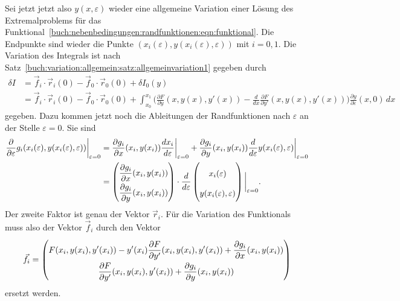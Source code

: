 Sei jetzt jetzt also $y(x,\varepsilon)$ wieder eine allgemeine Variation
einer Lösung des Extremalproblems für das
Funktional~\eqref{buch:nebenbedingungen:randfunktionen:eqn:funktional}.
Die Endpunkte sind wieder die Punkte
$(x_i(\varepsilon),y(x_i(\varepsilon),\varepsilon))$ mit $i=0,1$.
Die Variation des Integrals ist nach
Satz~\ref{buch:variation:allgemein:satz:allgemeinvariation1} 
gegeben durch
\begin{align*}
\delta I
&=
\vec{f}_i\cdot \vec{r}_i(0) - \vec{f}_0\cdot\vec{r}_0(0)
+
\delta I_0(y)
\\
&=
\vec{f}_i\cdot \vec{r}_i(0) - \vec{f}_0\cdot\vec{r}_0(0)
+
\int_{x_0}^{x_1}
\biggl(
\frac{\partial F}{\partial y}(x,y(x),y'(x))
-
\frac{d}{dx}\frac{\partial F}{\partial y'}(x,y(x),y'(x))
\biggr)
\frac{\partial y}{\partial\varepsilon}(x,0)
\,dx
\end{align*}
gegeben.
Dazu kommen jetzt noch die Ableitungen der Randfunktionen nach
$\varepsilon$ an der Stelle $\varepsilon=0$.
Sie sind
\begin{align*}
\frac{\partial}{\partial\varepsilon}
g_i(x_i(\varepsilon),y(x_i(\varepsilon),\varepsilon))
\bigg|_{\varepsilon=0}
&=
\frac{\partial g_i}{\partial x}(x_i,y(x_i))
\frac{d x_i}{d\varepsilon}\bigg|_{\varepsilon=0}
+
\frac{\partial g_i}{\partial y}(x_i,y(x_i))
\frac{d}{d\varepsilon}y(x_i(\varepsilon),\varepsilon)
\bigg|_{\varepsilon=0}
\\
&=
\bgroup
\renewcommand\arraystretch{2}
\begin{pmatrix}
\displaystyle
\frac{\partial g_i}{\partial x}(x_i,y(x_i))
\\
\displaystyle
\frac{\partial g_i}{\partial y}(x_i,y(x_i))
\end{pmatrix}
\egroup
\cdot
\frac{d}{d\varepsilon}
\begin{pmatrix}
x_i(\varepsilon)\\
y(x_i(\varepsilon),\varepsilon)
\end{pmatrix}
\bigg|_{\varepsilon=0}.
\end{align*}
Der zweite Faktor ist genau der Vektor $\vec{r}_i$. 
Für die Variation des Funktionals muss also der Vektor $\vec{f}_i$ durch
den Vektor
\begin{equation}
\vec{f}_i
=
\renewcommand\arraystretch{2}
\begin{pmatrix}
\displaystyle
F(x_i,y(x_i),y'(x_i))
-
y'(x_i) \frac{\partial F}{\partial y'}(x_i,y(x_i),y'(x_i))
+
\frac{\partial g_i}{\partial x}(x_i,y(x_i))
\\
\displaystyle
\frac{\partial F}{\partial y'}(x_i,y(x_i),y'(x_i))
+
\frac{\partial g_i}{\partial y}(x_i,y(x_i))
\end{pmatrix}
\label{buch:nebenbedingungen:randfunktionen:eqn:fnew}
\end{equation}
ersetzt werden.

